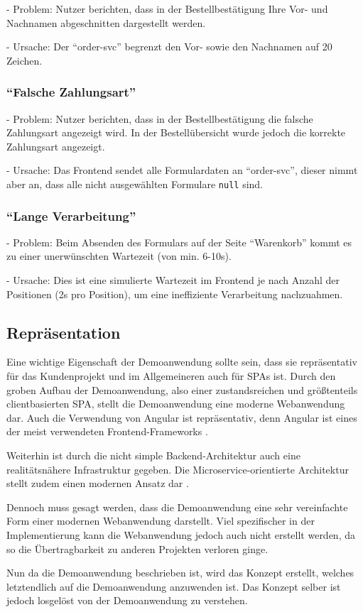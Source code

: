 - Problem: Nutzer berichten, dass in der Bestellbestätigung Ihre Vor- und Nachnamen abgeschnitten dargestellt werden.

- Ursache: Der \enquote{order-svc} begrenzt den Vor- sowie den Nachnamen auf 20 Zeichen.

\subsubsection{\enquote{Falsche Zahlungsart}}

- Problem: Nutzer berichten, dass in der Bestellbestätigung die falsche Zahlungsart angezeigt wird. In der Bestellübersicht wurde jedoch die korrekte Zahlungsart angezeigt.

- Ursache: Das Frontend sendet alle Formulardaten an \enquote{order-svc}, dieser nimmt aber an, dass alle nicht ausgewählten Formulare \texttt{null} sind.

\subsubsection{\enquote{Lange Verarbeitung}}

- Problem: Beim Absenden des Formulars auf der Seite \enquote{Warenkorb} kommt es zu einer unerwünschten Wartezeit (von min. 6-10s).

- Ursache: Dies ist eine simulierte Wartezeit im Frontend je nach Anzahl der Positionen (2s pro Position), um eine ineffiziente Verarbeitung nachzuahmen.

\subsection{Repräsentation}

Eine wichtige Eigenschaft der Demoanwendung sollte sein, dass sie repräsentativ für das Kundenprojekt und im Allgemeineren auch für SPAs ist. Durch den groben Aufbau der Demoanwendung, also einer zustandsreichen und größtenteils clientbasierten SPA, stellt die Demoanwendung eine moderne Webanwendung dar. Auch die Verwendung von Angular ist repräsentativ, denn Angular ist eines der meist verwendeten Frontend-Frameworks \cite{TheStateOfJavaScript2020}.

Weiterhin ist durch die nicht simple Backend-Architektur auch eine realitätsnähere Infrastruktur gegeben. Die Microservice-orientierte Architektur stellt zudem einen modernen Ansatz dar \cite{MicroserviceArchitecture}.

Dennoch muss gesagt werden, dass die Demoanwendung eine sehr vereinfachte Form einer modernen Webanwendung darstellt. Viel spezifischer in der Implementierung kann die Webanwendung jedoch auch nicht erstellt werden, da so die Übertragbarkeit zu anderen Projekten verloren ginge.

Nun da die Demoanwendung beschrieben ist, wird das Konzept erstellt, welches letztendlich auf die Demoanwendung anzuwenden ist. Das Konzept selber ist jedoch losgelöst von der Demoanwendung zu verstehen.